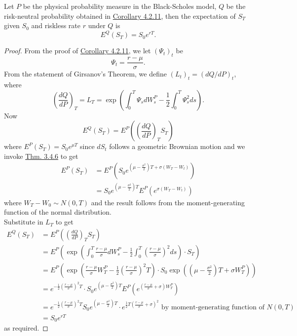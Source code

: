 \documentclass[11pt,fleqn]{book} %
\begin{document}
\begin{proposition} \label{prop:4214}
Let \(P\) be the physical probability measure in the Black-Scholes model, \(Q\) be the risk-neutral probability obtained in \hyperref[cor:4211]{Corollary 4.2.11}, then the expectation of \(S_T\) given \(S_0\) and riskless rate \(r\) under \(Q\) is
\[
E^Q(S_T) = S_0e^{rT}.
\]
\end{proposition}
\begin{proof}
From the proof of \hyperref[cor:4211]{Corollary 4.2.11}, we let \((\Psi_t)_t\) be
\[
\Psi_t = \frac{r - \mu}{\sigma}.
\]
\indent From the statement of Girsanov's Theorem, we define \((L_t)_t = (dQ/dP)_t\), where
\[
\left(\frac{dQ}{dP}\right)_T = L_T = \exp\left(\int_0^T\Psi_sdW_s^P - \frac12\int_0^T\Psi_s^2ds\right).
\]
\indent Now 
\[
E^Q(S_T) = E^P\left(\left(\frac{dQ}{dP}\right)_TS_T\right)
\]
where \(E^P(S_T) = S_0e^{\mu T}\) since \(dS_t\) follows a geometric Brownian motion and we invoke \hyperref[thm:346]{Thm. 3.4.6} to get
\[
\begin{aligned}
E^P(S_T) &= E^P\left(S_0e^{\left(\mu - \frac{\sigma^2}{2}\right)T + \sigma(W_T - W_t)}\right) \\
&= S_0e^{\left(\mu - \frac{\sigma^2}{2}\right)T}E^P(e^{\sigma(W_T - W_t)})
\end{aligned}
\]
where \(W_T - W_0 \sim N(0, T)\) and the result follows from the moment-generating function of the normal distribution. \\
\indent Substitute in \(L_T\) to get
\[
\begin{aligned}
E^Q(S_T) &= E^P\left(\left(\frac{dQ}{dP}\right)_TS_T\right) \\
&= E^P\left(\exp\left(\int_0^T\frac{r - \mu}{\sigma}dW_s^P - \frac12\int_0^T\left(\frac{r - \mu}{\sigma}\right)^2ds\right)\cdot S_T\right) \\
&= E^P\left(\exp\left(\frac{r - \mu}{\sigma}W_T^P - \frac12\left(\frac{r - \mu}{\sigma}\right)^2T\right) \cdot S_0\exp\left(\left(\mu - \frac{\sigma^2}{2}\right)T + \sigma W_T^P\right)\right) \\
&= e^{-\frac12\left(\frac{r - \mu}{\sigma}\right)^2T} \cdot S_0e^{\left(\mu - \frac{\sigma^2}{2}\right)T}E^P(e^{\left(\frac{r - \mu}{\sigma} + \sigma\right)W_T^P}) \\
&= e^{-\frac12\left(\frac{r - \mu}{\sigma}\right)^2T}S_0e^{\left(\mu - \frac{\sigma^2}{2}\right)T}\cdot e^{\frac12T\left(\frac{r - \mu}{\sigma} + \sigma\right)^2} \text{ by moment-generating function of } N(0, T) \\
&= S_0e^{rT}
\end{aligned}
\]
as required.
\end{proof}
\end{document}

